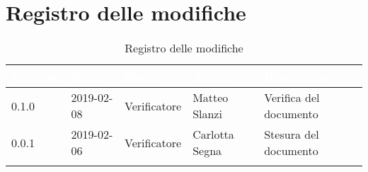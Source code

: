 \newpage

\section{Registro delle modifiche}

\begin{center}
\begin{longtable}[c]{|m{}|m{}|m{}|m{}|p{}|}
\hline
\rowcolor{bluelogo}\textbf{\textcolor{white}{Versione}} & \textbf{\textcolor{white}{Data}} & \textbf{\textcolor{white}{Ruolo}} & \textbf{\textcolor{white}{Autore}} & \textbf{\textcolor{white}{Descrizione}}\\
\hline \hline
\endfirsthead
\hline
\rowcolor{grigio} 0.1.0 & 2019-02-08 & Verificatore & Matteo Slanzi & Verifica del documento \\
\hline
0.0.1 & 2019-02-06 & Verificatore & Carlotta Segna & Stesura del documento \\
\hline
\caption{Registro delle modifiche}
\end{longtable}
\end{center}